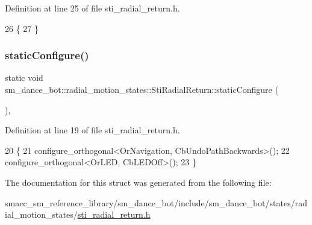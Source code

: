 Definition at line 25 of file sti\+\_\+radial\+\_\+return.\+h.


\begin{DoxyCode}
26   \{
27   \}
\end{DoxyCode}
\mbox{\label{structsm__dance__bot_1_1radial__motion__states_1_1StiRadialReturn_aa657a5b660ec8ee8e8f100c52d63551d}} 
\subsubsection{\texorpdfstring{static\+Configure()}{staticConfigure()}}
{\footnotesize\ttfamily static void sm\+\_\+dance\+\_\+bot\+::radial\+\_\+motion\+\_\+states\+::\+Sti\+Radial\+Return\+::static\+Configure (\begin{DoxyParamCaption}{ }\end{DoxyParamCaption})\hspace{0.3cm}{\ttfamily [inline]}, {\ttfamily [static]}}



Definition at line 19 of file sti\+\_\+radial\+\_\+return.\+h.


\begin{DoxyCode}
20   \{
21     configure\_orthogonal<OrNavigation, CbUndoPathBackwards>();
22     configure\_orthogonal<OrLED, CbLEDOff>();
23   \}
\end{DoxyCode}


The documentation for this struct was generated from the following file\+:\begin{DoxyCompactItemize}
\item 
smacc\+\_\+sm\+\_\+reference\+\_\+library/sm\+\_\+dance\+\_\+bot/include/sm\+\_\+dance\+\_\+bot/states/radial\+\_\+motion\+\_\+states/\hyperlink{include_2sm__dance__bot_2states_2radial__motion__states_2sti__radial__return_8h}{sti\+\_\+radial\+\_\+return.\+h}\end{DoxyCompactItemize}
